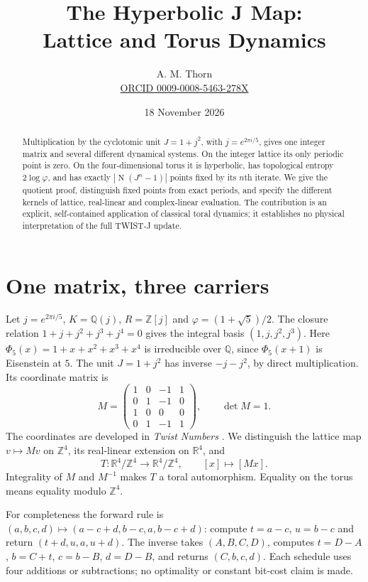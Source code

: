 \documentclass[11pt,a4paper]{article}
\title{The Hyperbolic J Map:\\Lattice and Torus Dynamics}
\author{A. M. Thorn\\\small\href{https://orcid.org/0009-0008-5463-278X}{ORCID 0009-0008-5463-278X}}
\date{18 November 2026}
\newcommand{\Z}{\mathbb Z}
\newcommand{\Q}{\mathbb Q}
\newcommand{\R}{\mathbb R}
\newcommand{\ph}{\varphi}
\newcommand{\Nm}{\operatorname{N}}
\begin{document}
\maketitle
\begin{abstract}
Multiplication by the cyclotomic unit $J=1+j^2$, with
$j=e^{2\pi i/5}$, gives one integer matrix and several different
dynamical systems. On the integer lattice its only periodic point is
zero. On the four-dimensional torus it is hyperbolic, has topological
entropy $2\log\ph$, and has exactly $|\Nm(J^n-1)|$ points fixed by
its $n$th iterate. We give the quotient proof, distinguish fixed points
from exact periods, and specify the different kernels of lattice,
real-linear and complex-linear evaluation. The contribution is an
explicit, self-contained application of classical toral dynamics;
it establishes no physical interpretation of the full TWIST-J update.
\end{abstract}

\section{One matrix, three carriers}\label{sec:carriers}
Let $j=e^{2\pi i/5}$, $K=\Q(j)$, $R=\Z[j]$ and
$\ph=(1+\sqrt5)/2$. The closure relation
$1+j+j^2+j^3+j^4=0$ gives the integral basis $(1,j,j^2,j^3)$.
Here $\Phi_5(x)=1+x+x^2+x^3+x^4$ is irreducible over $\Q$,
since $\Phi_5(x+1)$ is Eisenstein at $5$. The unit
$J=1+j^2$ has inverse $-j-j^2$, by direct multiplication.
Its coordinate matrix is
\begin{equation}\label{eq:matrix}
 M=\begin{pmatrix}
 1&0&-1&1\\0&1&-1&0\\1&0&0&0\\0&1&-1&1
 \end{pmatrix},\qquad \det M=1.
\end{equation}
The coordinates are developed in \emph{Twist Numbers} \cite{twist}.
We distinguish the lattice map
$v\mapsto Mv$ on $\Z^4$, its real-linear extension on $\R^4$, and
\begin{equation}\label{eq:torus}
 T:\R^4/\Z^4\longrightarrow\R^4/\Z^4,\qquad [x]\longmapsto[Mx].
\end{equation}
Integrality of $M$ and $M^{-1}$ makes $T$ a toral automorphism.
Equality on the torus means equality modulo $\Z^4$.

For completeness the forward rule is
$(a,b,c,d)\mapsto(a-c+d,b-c,a,b-c+d)$: compute $t=a-c$, $u=b-c$
and return $(t+d,u,a,u+d)$. The inverse takes $(A,B,C,D)$, computes
$t=D-A$, $b=C+t$, $c=b-B$, $d=D-B$, and returns $(C,b,c,d)$.
Each schedule uses four additions or subtractions; no optimality or
constant bit-cost claim is made.
\end{document}
